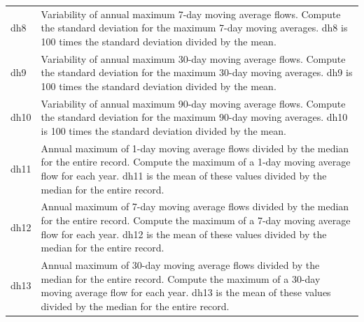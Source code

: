 \documentclass[a4paper,11pt]{article}\usepackage[]{graphicx}\usepackage[]{color}
\begin{document}
\begin{table}[ht]
\begin{threeparttable}[b]
\begin{tabularx}{\textwidth}{|l|X|}
  dh8 & Variability of annual maximum 7-day moving average flows. Compute the standard deviation for the maximum 7-day moving averages. dh8 is 100 times the standard deviation divided by the mean. \\
  dh9 & Variability of annual maximum 30-day moving average flows. Compute the standard deviation for the maximum 30-day moving averages. dh9 is 100 times the standard deviation divided by the mean. \\
  dh10 & Variability of annual maximum 90-day moving average flows. Compute the standard deviation for the maximum 90-day moving averages. dh10 is 100 times the standard deviation divided by the mean. \\
  dh11 & Annual maximum of 1-day moving average flows divided by the median for the entire record. Compute the maximum of a 1-day moving average flow for each year. dh11 is the mean of these values divided by the median for the entire record. \\
  dh12 & Annual maximum of 7-day moving average flows divided by the median for the entire record. Compute the maximum of a 7-day moving average flow for each year. dh12 is the mean of these values divided by the median for the entire record. \\
  dh13 & Annual maximum of 30-day moving average flows divided by the median for the entire record. Compute the maximum of a 30-day moving average flow for each year. dh13 is the mean of these values divided by the median for the entire record. \\
      \hline
  \end{tabularx}
  \end{threeparttable}
\end{table}
\end{document}
